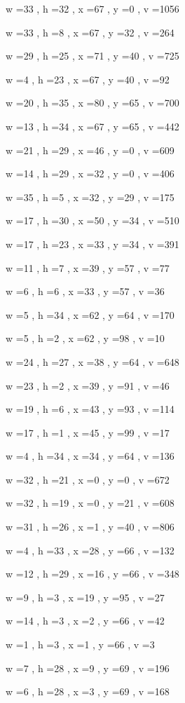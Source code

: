 \documentclass[11pt]{article}
\begin{document}
w =33 , h =32 , x =67 , y =0 , v =1056
\par
w =33 , h =8 , x =67 , y =32 , v =264
\par
w =29 , h =25 , x =71 , y =40 , v =725
\par
w =4 , h =23 , x =67 , y =40 , v =92
\par
w =20 , h =35 , x =80 , y =65 , v =700
\par
w =13 , h =34 , x =67 , y =65 , v =442
\par
w =21 , h =29 , x =46 , y =0 , v =609
\par
w =14 , h =29 , x =32 , y =0 , v =406
\par
w =35 , h =5 , x =32 , y =29 , v =175
\par
w =17 , h =30 , x =50 , y =34 , v =510
\par
w =17 , h =23 , x =33 , y =34 , v =391
\par
w =11 , h =7 , x =39 , y =57 , v =77
\par
w =6 , h =6 , x =33 , y =57 , v =36
\par
w =5 , h =34 , x =62 , y =64 , v =170
\par
w =5 , h =2 , x =62 , y =98 , v =10
\par
w =24 , h =27 , x =38 , y =64 , v =648
\par
w =23 , h =2 , x =39 , y =91 , v =46
\par
w =19 , h =6 , x =43 , y =93 , v =114
\par
w =17 , h =1 , x =45 , y =99 , v =17
\par
w =4 , h =34 , x =34 , y =64 , v =136
\par
w =32 , h =21 , x =0 , y =0 , v =672
\par
w =32 , h =19 , x =0 , y =21 , v =608
\par
w =31 , h =26 , x =1 , y =40 , v =806
\par
w =4 , h =33 , x =28 , y =66 , v =132
\par
w =12 , h =29 , x =16 , y =66 , v =348
\par
w =9 , h =3 , x =19 , y =95 , v =27
\par
w =14 , h =3 , x =2 , y =66 , v =42
\par
w =1 , h =3 , x =1 , y =66 , v =3
\par
w =7 , h =28 , x =9 , y =69 , v =196
\par
w =6 , h =28 , x =3 , y =69 , v =168
\par
\newpage
\end{document}
